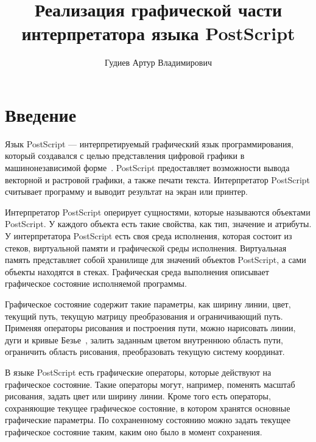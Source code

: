 \title{Реализация графической части\\
интерпретатора языка PostScript}
%
\author{Гудиев Артур Владимирович}
%
%
%

\maketitle

\section*{Введение}
 
Язык PostScript --- интерпретируемый графический язык программирования, который создавался с целью представления цифровой графики в машинонезависимой форме~\cite{plrm2}. PostScript предоставляет возможности вывода векторной и растровой графики, а также печати текста. Интерпретатор PostScript считывает программу и выводит результат на экран или принтер. 
  
Интерпретатор PostScript оперирует сущностями, которые называются объектами PostScript. У каждого объекта есть такие свойства, как тип, значение и атрибуты. У интерпретатора PostScript есть своя среда исполнения, которая состоит из стеков, виртуальной памяти и графической среды исполнения. Виртуальная память представляет собой хранилище для значений объектов PostScript, а сами объекты находятся в стеках. Графическая среда выполнения описывает графическое состояние исполняемой программы.

Графическое состояние содержит  такие параметры, как ширину линии,  цвет,  текущий путь, текущую матрицу преобразования и  ограничивающий путь.  Применяя операторы рисования и построения пути, можно нарисовать линии, дуги и кривые Безье~\cite{graphics}, залить заданным цветом внутреннюю область  пути, ограничить область рисования, преобразовать текущую систему координат.


В языке PostScript есть графические операторы, которые действуют на графическое состояние. Такие операторы могут, например, поменять масштаб рисования, задать цвет или ширину линии. Кроме того есть операторы, сохраняющие текущее графическое состояние, в котором хранятся основные графические параметры. По сохраненному состоянию можно задать текущее графическое состояние таким, каким оно было в момент сохранения.  

